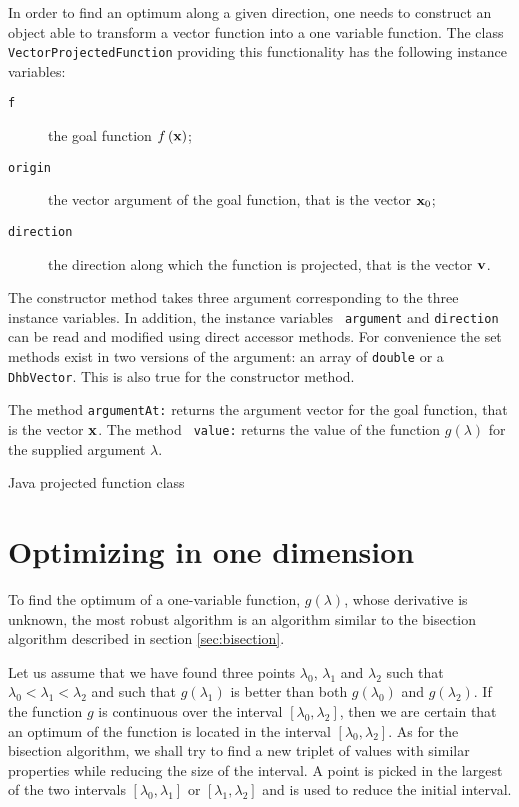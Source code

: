 \documentclass[twoside]{book}
\begin{document}
In order to find an optimum along a given direction, one needs to
construct an object able to transform a vector function into a one
variable function. The class {\tt VectorProjectedFunction}
providing this functionality has the following instance variables:
\begin{description}
  \item[\tt f] the goal function $f\left({\bf x}\right)$;
  \item[\tt origin] the vector argument of the goal function,
  that is the vector ${\bf x}_0$;
  \item[\tt direction] the direction along which the function
  is projected,
  that is the vector ${\bf v}$.
\end{description}
The constructor method takes three argument corresponding to the
three instance variables. In addition, the instance variables {\tt
argument} and {\tt direction} can be read and modified using
direct accessor methods. For convenience the set methods exist in
two versions of the argument: an array of {\tt double} or a {\tt
DhbVector}. This is also true for the constructor method.

The method {\tt argumentAt:} returns the argument vector for the
goal function, that is the vector ${\bf x}$. The method {\tt
value:} returns the value of the function $g\left(\lambda\right)$
for the supplied argument $\lambda$.
\begin{listing} Java projected function class \label{lj:projectedfunctions}

\end{listing}

\section{Optimizing in one dimension}
\label{sec:optonedim} To find the optimum of a one-variable
function, $g\left(\lambda\right)$, whose derivative is unknown,
the most robust algorithm is an algorithm similar to the bisection
algorithm described in section \ref{sec:bisection}.

Let us assume that we have found three points $\lambda_0$,
$\lambda_1$ and $\lambda_2$ such that
$\lambda_0<\lambda_1<\lambda_2$ and such that
$g\left(\lambda_1\right)$ is better than both
$g\left(\lambda_0\right)$ and $g\left(\lambda_2\right)$. If the
function $g$ is continuous over the interval
$\left[\lambda_0,\lambda_2\right]$, then we are certain that an
optimum of the function is located in the interval
$\left[\lambda_0,\lambda_2\right]$. As for the bisection
algorithm, we shall try to find a new triplet of values with
similar properties while reducing the size of the interval. A
point is picked in the largest of the two intervals
$\left[\lambda_0,\lambda_1\right]$ or
$\left[\lambda_1,\lambda_2\right]$ and is used to reduce the
initial interval.
\end{document}
